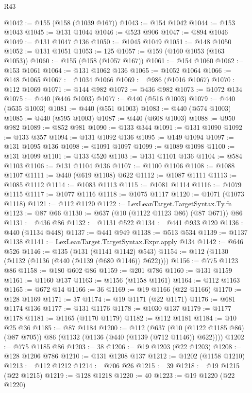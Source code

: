 \begin{lexlean}{R43}
\begin{coremodule}
@1042 := @155 (@158 (@1039 @167))
@1043 := @154 @1042
@1044 := @153 @1043
@1045 := @131 @1044
@1046 := @523 @906
@1047 := @894 @1046
@1049 := @131 @1047 @136
@1050 := @1045 @1049
@1051 := @148 @1050
@1052 := @131 @1051
@1053 := 125
@1057 := @159 (@160 @1053 (@163 @1053))
@1060 := @155 (@158 (@1057 @167))
@1061 := @154 @1060
@1062 := @153 @1061
@1064 := @131 @1062 @136
@1065 := @1052 @1064
@1066 := @148 @1065
@1067 := @1034 @1066
@1069 := @986 (@1016 @1067)
@1070 := @112 @1069
@1071 := @144 @982
@1072 := @436 @982
@1073 := @1072 @134
@1075 := @440 (@446 @1003)
@1077 := @440 (@516 @1003)
@1079 := @440 (@535 @1003)
@1081 := @440 (@551 @1003)
@1083 := @440 (@574 @1003)
@1085 := @440 (@595 @1003)
@1087 := @440 (@608 @1003)
@1088 := @950 @982
@1089 := @852 @981
@1090 := @133 @344
@1091 := @131 @1090
@1092 := @133 @357
@1094 := @131 @1092 @136
@1095 := @149 @1094
@1097 := @131 @1095 @136
@1098 := @1091 @1097
@1099 := @1089 @1098
@1100 := @131 @1099
@1101 := @133 @520
@1103 := @131 @1101 @136
@1104 := @584 @1103
@1106 := @131 @1104 @136
@1107 := @1100 @1106
@1108 := @1088 @1107
@1111 := @440 (@619 @1108) @622
@1112 := @1087 @1111
@1113 := @1085 @1112
@1114 := @1083 @1113
@1115 := @1081 @1114
@1116 := @1079 @1115
@1117 := @1077 @1116
@1118 := @1075 @1117
@1120 := @1071 (@1073 @1118)
@1121 := @112 @1120
@1122 := LexLeanTarget.TargetSyntax.Ty.fn
@1123 := @87 @66
@1130 := @637 (@10 (@1122 @1123 @86) (@87 @671)) @86
@1131 := @436 @86
@1132 := @1131 @522
@1134 := @441 @933 @120
@1136 := @440 (@1134 @448)
@1137 := @441 @949
@1138 := @513 @534
@1139 := @1137 @1138
@1141 := LexLeanTarget.TargetSyntax.Expr.apply @134
@1142 := @646 @526
@1146 := @135 (@131 (@1141 @1142) @543)
@1154 := @112 (@1130 (@1132 (@1136 (@440 (@1139 (@680 @1146)) @622))))
@1156 := @775 @1123 @86
@1158 := @180 @602 @86
@1159 := @201 @786
@1160 := @131 @1159
@1161 := @1160 @137
@1163 := @1156 (@1158 @1161)
@1164 := @112 @1163
@1165 := @672 @14
@1166 := 36
@1169 := @19 @1166 (@22 @1166)
@1170 := @128 @1169
@1171 := 37
@1174 := @19 @1171 (@22 @1171)
@1176 := @681 @1174 @136
@1177 := @131 @1176
@1178 := @1030 @137
@1179 := @1177 @1178
@1181 := @1165 (@1170 @1179)
@1182 := @112 @1181
@1184 := @10 @25 @36
@1185 := @87 @1184
@1200 := @112
    (@637 (@10 (@1122 @1185 @86) (@87 @705)) @86 (@1132 (@1136 (@440 (@1139 (@712 @1146)) @622))))
@1202 := @775 @1185 @86
@1203 := 38
@1206 := @19 @1203 (@22 @1203)
@1208 := @128 @1206 @786
@1210 := @131 @1208 @137
@1212 := @1202 (@1158 @1210)
@1213 := @112 @1212
@1214 := @706 @26
@1215 := 39
@1218 := @19 @1215 (@22 @1215)
@1219 := @128 @1218
@1220 := 40
@1223 := @19 @1220 (@22 @1220)

\end{coremodule}
\end{lexlean}
